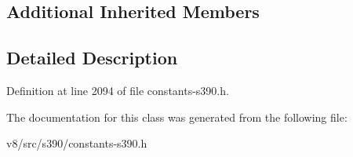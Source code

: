 \subsection*{Additional Inherited Members}


\subsection{Detailed Description}


Definition at line 2094 of file constants-\/s390.\+h.



The documentation for this class was generated from the following file\+:\begin{DoxyCompactItemize}
\item 
v8/src/s390/constants-\/s390.\+h\end{DoxyCompactItemize}
